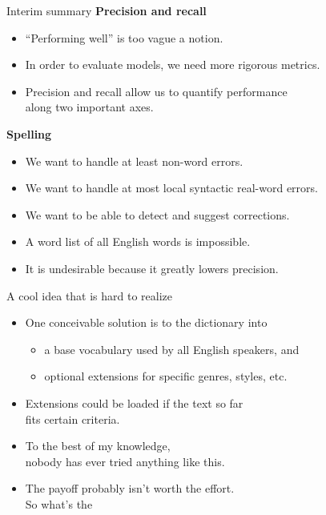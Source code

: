 \documentclass[professionalfonts, xcolor={usenames,svgnames,x11names,table}]{beamer}
\begin{document}
\begin{frame}{Interim summary}
    \textbf{Precision and recall}
    \begin{itemize}
        \item ``Performing well'' is too vague a notion.
        \item In order to evaluate models, we need more rigorous metrics.
        \item Precision and recall allow us to quantify performance\\
              along two important axes.
    \end{itemize}

    \textbf{Spelling}
    \begin{itemize}
        \item We want to handle at least non-word errors.
        \item We want to handle at most local syntactic real-word errors.
        \item We want to be able to detect and suggest corrections.
        \item A word list of all English words is impossible.
        \item It is undesirable because it greatly lowers precision.
    \end{itemize}
\end{frame}

\begin{frame}{A cool idea that is hard to realize}
    \begin{itemize}
        \item One conceivable solution is to  the dictionary into
            \begin{itemize}
                \item a base vocabulary used by all English speakers, and
                \item optional extensions for specific genres, styles, etc.
            \end{itemize}
        \item Extensions could be loaded if the text so far\\
              fits certain criteria.\\
        \item To the best of my knowledge,\\
              nobody has ever tried anything like this.
        \item The payoff probably isn't worth the effort.\\
              So what's the 
    \end{itemize}
\end{frame}
\end{document}
